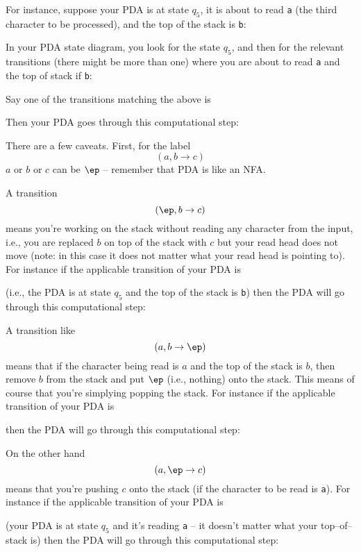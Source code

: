 For instance, suppose your PDA is at state $q_5$, it is
about to read \verb!a! (the third character to be processed),
and
the top of the stack is
\verb!b!:



In your PDA state diagram,
you look for the state $q_5$, and then 
for the relevant transitions (there might be more than one)
where you are about to read \verb!a! and the top of stack if
\verb!b!:



Say one of the transitions matching the above is 



Then your PDA goes through this computational step:



There are a few caveats.
First, for the label
\[
(a, b \rightarrow c)
\]
$a$ or $b$ or $c$ can be $\ep$
-- remember that PDA is like an NFA.

A transition
\[
(\ep, b \rightarrow c)
\]
means 
you're working on the stack without reading any character from the
input, i.e., you are replaced $b$ on top of the stack with $c$
but your read head does not move
(note: in this case it does not matter what your read head is pointing to).
For instance if the applicable transition of your PDA is



(i.e., the PDA is at state $q_5$ and the top of the stack is \verb!b!)
then the PDA will go through this computational step:



A transition like
\[
(a, b \rightarrow \ep)
\]
means that if the character being read is $a$ and the top of the
stack is $b$, then remove $b$ from the stack and put $\ep$  (i.e., nothing)
onto the stack.
This means of course that you're simplying popping the stack.
For instance if the applicable transition of your PDA is



then the PDA will go through this computational step:



On the other hand
\[
(a, \ep \rightarrow c)
\]
means that
you're pushing $c$ onto the stack
(if the character to be read is \verb!a!).
For instance if the applicable transition of your PDA is


(your PDA is at state $q_5$ and it's reading \verb!a! --
it doesn't matter what your top--of--stack is)
then the PDA will go through this computational step:

